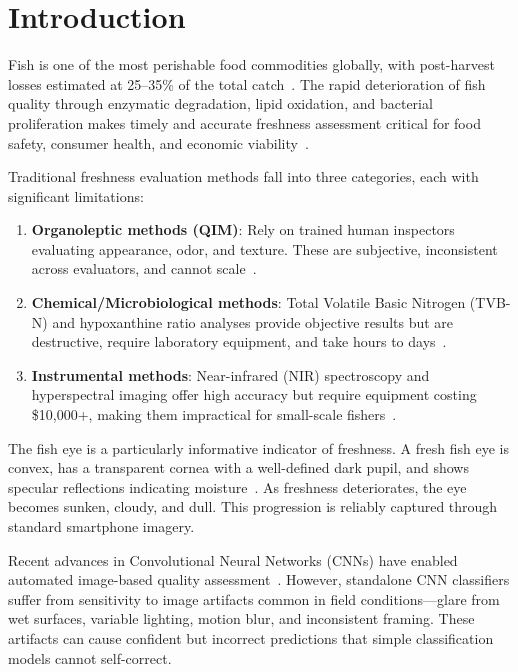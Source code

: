 \documentclass[conference]{IEEEtran}
\begin{document}
\section{Introduction}

Fish is one of the most perishable food commodities globally, with post-harvest losses estimated at 25--35\% of the total catch~\cite{ref1, ref20}. The rapid deterioration of fish quality through enzymatic degradation, lipid oxidation, and bacterial proliferation makes timely and accurate freshness assessment critical for food safety, consumer health, and economic viability~\cite{ref6}.

Traditional freshness evaluation methods fall into three categories, each with significant limitations:
\begin{enumerate}[leftmargin=*]
    \item \textbf{Organoleptic methods (QIM)}: Rely on trained human inspectors evaluating appearance, odor, and texture. These are subjective, inconsistent across evaluators, and cannot scale~\cite{ref1}.
    \item \textbf{Chemical/Microbiological methods}: Total Volatile Basic Nitrogen (TVB-N) and hypoxanthine ratio analyses provide objective results but are destructive, require laboratory equipment, and take hours to days~\cite{ref18}.
    \item \textbf{Instrumental methods}: Near-infrared (NIR) spectroscopy and hyperspectral imaging offer high accuracy but require equipment costing \$10,000+, making them impractical for small-scale fishers~\cite{ref3, ref13}.
\end{enumerate}

The fish eye is a particularly informative indicator of freshness. A fresh fish eye is convex, has a transparent cornea with a well-defined dark pupil, and shows specular reflections indicating moisture~\cite{ref19}. As freshness deteriorates, the eye becomes sunken, cloudy, and dull. This progression is reliably captured through standard smartphone imagery.

Recent advances in Convolutional Neural Networks (CNNs) have enabled automated image-based quality assessment~\cite{ref19}. However, standalone CNN classifiers suffer from sensitivity to image artifacts common in field conditions---glare from wet surfaces, variable lighting, motion blur, and inconsistent framing. These artifacts can cause confident but incorrect predictions that simple classification models cannot self-correct.
\end{document}
